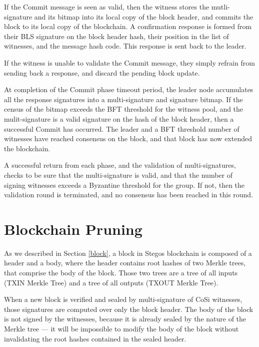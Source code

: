 \documentclass[a4paper, 10pt, conference]{ieeeconf}
\begin{document}
\begin{itemize}
{{	\item{If the Commit message is seen as valid, then the witness stores the mutli-signature and its bitmap into its local copy of the block header, and commits the block to its local copy of the blockchain. A confirmation response is formed from their BLS signature on the block header hash, their position in the list of witnesses, and the message hash code. This response is sent back to the leader.}

	\item{If the witness is unable to validate the Commit message, they simply refrain from sending back a response, and discard the pending block update.}}

	\item{At completion of the Commit phase timeout period, the leader node accumulates all the response signatures into a multi-signature and signature bitmap. If the census of the bitmap exceeds the BFT threshold for the witness pool, and the mulit-signature is a valid signature on the hash of the block header, then a successful Commit has occurred. The leader and a BFT threshold number of witnesses have reached consensus on the block, and that block has now extended the blockchain.}
	}
\end{itemize}

A successful return from each phase, and the validation of multi-signatures, checks to be sure that the multi-signature is valid, and that the number of signing witnesses exceeds a Byzantine threshold for the group. If not, then the validation round is terminated, and no consensus has been reached in this round.

\section{Blockchain Pruning}\label{pruning}

As we described in Section \ref{block}, a block in Stegos blockchain is composed of a header and a body, where the header contains root hashes of two Merkle trees, that comprise the body of the block. Those two trees are a tree of all inputs (TXIN Merkle Tree) and a tree of all outputs (TXOUT Merkle Tree). 

When a new block is verified and sealed by multi-signature of CoSi witnesses, those signatures are computed over only the block header. The body of the block is not signed by the witnesses, because it is already sealed by the nature of the Merkle tree --- it will be impossible to modify the body of the block without invalidating the root hashes contained in the sealed header.
\end{document}
